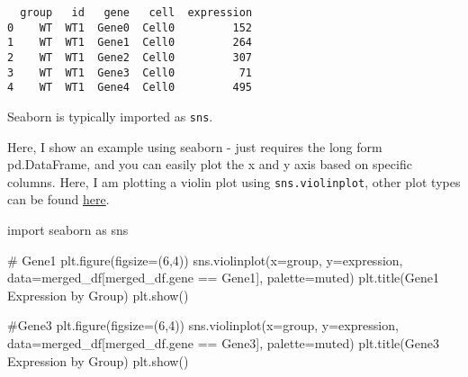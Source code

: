 \documentclass[
  letterpaper,
  DIV=11,
  numbers=noendperiod]{scrartcl}
\newenvironment{Shaded}{\begin{snugshade}}{\end{snugshade}}
\newcommand{\CommentTok}[1]{\textcolor[rgb]{0.37,0.37,0.37}{#1}}
\newcommand{\DecValTok}[1]{\textcolor[rgb]{0.68,0.00,0.00}{#1}}
\newcommand{\ImportTok}[1]{\textcolor[rgb]{0.00,0.46,0.62}{#1}}
\newcommand{\NormalTok}[1]{\textcolor[rgb]{0.00,0.23,0.31}{#1}}
\newcommand{\OperatorTok}[1]{\textcolor[rgb]{0.37,0.37,0.37}{#1}}
\newcommand{\StringTok}[1]{\textcolor[rgb]{0.13,0.47,0.30}{#1}}
\begin{document}
\begin{verbatim}
  group   id   gene   cell  expression
0    WT  WT1  Gene0  Cell0         152
1    WT  WT1  Gene1  Cell0         264
2    WT  WT1  Gene2  Cell0         307
3    WT  WT1  Gene3  Cell0          71
4    WT  WT1  Gene4  Cell0         495
\end{verbatim}

Seaborn is typically imported as \texttt{sns}.

Here, I show an example using seaborn - just requires the long form
pd.DataFrame, and you can easily plot the x and y axis based on specific
columns. Here, I am plotting a violin plot using
\texttt{sns.violinplot}, other plot types can be found
\href{https://seaborn.pydata.org/api.html}{here}.

\begin{Shaded}
\begin{Highlighting}[]
\ImportTok{import}\NormalTok{ seaborn }\ImportTok{as}\NormalTok{ sns}

\CommentTok{\# Gene1}
\NormalTok{plt.figure(figsize}\OperatorTok{=}\NormalTok{(}\DecValTok{6}\NormalTok{,}\DecValTok{4}\NormalTok{))}
\NormalTok{sns.violinplot(x}\OperatorTok{=}\StringTok{\textquotesingle{}group\textquotesingle{}}\NormalTok{, y}\OperatorTok{=}\StringTok{\textquotesingle{}expression\textquotesingle{}}\NormalTok{, data}\OperatorTok{=}\NormalTok{merged\_df[merged\_df.gene }\OperatorTok{==} \StringTok{\textquotesingle{}Gene1\textquotesingle{}}\NormalTok{], palette}\OperatorTok{=}\StringTok{\textquotesingle{}muted\textquotesingle{}}\NormalTok{)}
\NormalTok{plt.title(}\StringTok{\textquotesingle{}Gene1 Expression by Group\textquotesingle{}}\NormalTok{)}
\NormalTok{plt.show()}

\CommentTok{\#Gene3}
\NormalTok{plt.figure(figsize}\OperatorTok{=}\NormalTok{(}\DecValTok{6}\NormalTok{,}\DecValTok{4}\NormalTok{))}
\NormalTok{sns.violinplot(x}\OperatorTok{=}\StringTok{\textquotesingle{}group\textquotesingle{}}\NormalTok{, y}\OperatorTok{=}\StringTok{\textquotesingle{}expression\textquotesingle{}}\NormalTok{, data}\OperatorTok{=}\NormalTok{merged\_df[merged\_df.gene }\OperatorTok{==} \StringTok{\textquotesingle{}Gene3\textquotesingle{}}\NormalTok{], palette}\OperatorTok{=}\StringTok{\textquotesingle{}muted\textquotesingle{}}\NormalTok{)}
\NormalTok{plt.title(}\StringTok{\textquotesingle{}Gene3 Expression by Group\textquotesingle{}}\NormalTok{)}
\NormalTok{plt.show()}
\end{Highlighting}
\end{Shaded}
\end{document}
